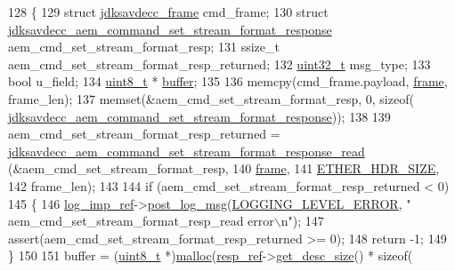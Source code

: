 \begin{DoxyCode}
128 \{
129     \textcolor{keyword}{struct }\hyperlink{structjdksavdecc__frame}{jdksavdecc\_frame} cmd\_frame;
130     \textcolor{keyword}{struct }\hyperlink{structjdksavdecc__aem__command__set__stream__format__response}{jdksavdecc\_aem\_command\_set\_stream\_format\_response}
       aem\_cmd\_set\_stream\_format\_resp;
131     ssize\_t aem\_cmd\_set\_stream\_format\_resp\_returned;
132     \hyperlink{parse_8c_a6eb1e68cc391dd753bc8ce896dbb8315}{uint32\_t} msg\_type;
133     \textcolor{keywordtype}{bool} u\_field;
134     \hyperlink{stdint_8h_aba7bc1797add20fe3efdf37ced1182c5}{uint8\_t} * \hyperlink{_hello_test_8cpp_a8be6d469a7cd1c8d66cc6d2d1e10c65b}{buffer};
135 
136     memcpy(cmd\_frame.payload, \hyperlink{gst__avb__playbin_8c_ac8e710e0b5e994c0545d75d69868c6f0}{frame}, frame\_len);
137     memset(&aem\_cmd\_set\_stream\_format\_resp, 0, \textcolor{keyword}{sizeof}(
      \hyperlink{structjdksavdecc__aem__command__set__stream__format__response}{jdksavdecc\_aem\_command\_set\_stream\_format\_response}));
138 
139     aem\_cmd\_set\_stream\_format\_resp\_returned = 
      \hyperlink{group__command__set__stream__format__response_ga6e89b94300d1d27dc34f6b57fa234690}{jdksavdecc\_aem\_command\_set\_stream\_format\_response\_read}
      (&aem\_cmd\_set\_stream\_format\_resp,
140                                                                                                      
      \hyperlink{gst__avb__playbin_8c_ac8e710e0b5e994c0545d75d69868c6f0}{frame},
141                                                                                                      
      \hyperlink{namespaceavdecc__lib_a6c827b1a0d973e18119c5e3da518e65ca9512ad9b34302ba7048d88197e0a2dc0}{ETHER\_HDR\_SIZE},
142                                                                                                      
      frame\_len);
143 
144     \textcolor{keywordflow}{if} (aem\_cmd\_set\_stream\_format\_resp\_returned < 0)
145     \{
146         \hyperlink{namespaceavdecc__lib_acbe3e2a96ae6524943ca532c87a28529}{log\_imp\_ref}->\hyperlink{classavdecc__lib_1_1log_a68139a6297697e4ccebf36ccfd02e44a}{post\_log\_msg}(\hyperlink{namespaceavdecc__lib_a501055c431e6872ef46f252ad13f85cdaf2c4481208273451a6f5c7bb9770ec8a}{LOGGING\_LEVEL\_ERROR}, \textcolor{stringliteral}{"
      aem\_cmd\_set\_stream\_format\_resp\_read error\(\backslash\)n"});
147         assert(aem\_cmd\_set\_stream\_format\_resp\_returned >= 0);
148         \textcolor{keywordflow}{return} -1;
149     \}
150 
151     buffer = (\hyperlink{stdint_8h_aba7bc1797add20fe3efdf37ced1182c5}{uint8\_t} *)\hyperlink{_memory_leak_detector_malloc_macros_8h_ab8b25cd8f16d4a6552afe4e65c4f082d}{malloc}(\hyperlink{classavdecc__lib_1_1descriptor__base__imp_a2642e3a7c10d38553e7ff4a55e875346}{resp\_ref}->\hyperlink{classavdecc__lib_1_1response__frame_a5302ae13c549f066040ce0e7c7d11ae6}{get\_desc\_size}() * \textcolor{keyword}{sizeof}(

\end{DoxyCode}
